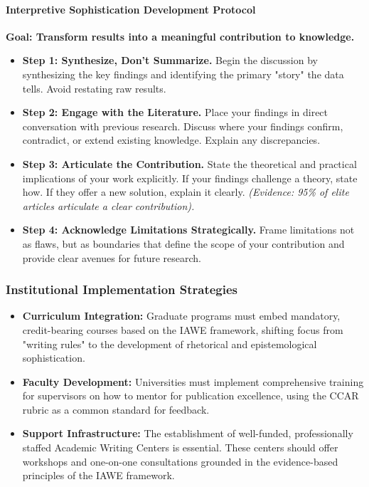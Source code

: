 \documentclass[journal,article,submit,pdftex,moreauthors]{Definitions/mdpi}
\begin{document}
\paragraph{Interpretive Sophistication Development Protocol}

\textbf{Goal: Transform results into a meaningful contribution to knowledge.}
\begin{itemize}
\item \textbf{Step 1: Synthesize, Don't Summarize.} Begin the discussion by synthesizing the key findings and identifying the primary "story" the data tells. Avoid restating raw results.
\item \textbf{Step 2: Engage with the Literature.} Place your findings in direct conversation with previous research. Discuss where your findings confirm, contradict, or extend existing knowledge. Explain any discrepancies.
\item \textbf{Step 3: Articulate the Contribution.} State the theoretical and practical implications of your work explicitly. If your findings challenge a theory, state how. If they offer a new solution, explain it clearly. \textit{(Evidence: 95\% of elite articles articulate a clear contribution).}
\item \textbf{Step 4: Acknowledge Limitations Strategically.} Frame limitations not as flaws, but as boundaries that define the scope of your contribution and provide clear avenues for future research.
\end{itemize}

\subsubsection{Institutional Implementation Strategies}

\begin{itemize}
\item \textbf{Curriculum Integration:} Graduate programs must embed mandatory, credit-bearing courses based on the IAWE framework, shifting focus from "writing rules" to the development of rhetorical and epistemological sophistication.
\item \textbf{Faculty Development:} Universities must implement comprehensive training for supervisors on how to mentor for publication excellence, using the CCAR rubric as a common standard for feedback.
\item \textbf{Support Infrastructure:} The establishment of well-funded, professionally staffed Academic Writing Centers is essential. These centers should offer workshops and one-on-one consultations grounded in the evidence-based principles of the IAWE framework.
\end{itemize}
\end{document}
